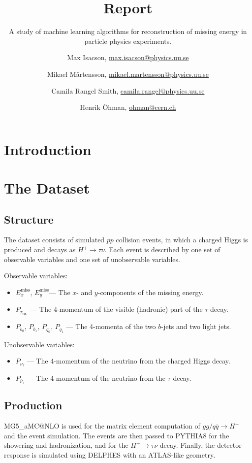 \documentclass{scrartcl}
\title{Report}
\subtitle{A study of machine learning algorithms for reconstruction of missing energy in particle physics experiments.}
\author{
  Max Isacson, \url{max.isacson@physics.uu.se}
  \and
  Mikael M\aa rtensson, \url{mikael.martensson@physics.uu.se}
  \and
  Camila Rangel Smith, \url{camila.rangel@physics.uu.se}
  \and
  Henrik Öhman, \url{ohman@cern.ch}
}
\newcommand{\exmiss}{$E_x^\text{miss}$}
\newcommand{\eymiss}{$E_y^\text{miss}$}
\begin{document}
\maketitle


\section{Introduction}

\section{The Dataset}
\subsection{Structure}
The dataset consists of simulated $pp$ collision events, in which a charged Higgs is produced and decays as $H^+\to\tau\nu$. Each event is described by one set of observable variables and one set of unobservable variables.

Observable variables:
\begin{itemize}
    \item \exmiss, \eymiss --- The $x$- and $y$-components of the missing energy.
    \item $P_{\tau_\mathrm{vis.}}$ --- The 4-momentum of the visible (hadronic) part of the $\tau$ decay.
    \item $P_{b_0}$, $P_{b_1}$, $P_{q_0}$, $P_{q_1}$ --- The 4-momenta of the two $b$-jets and two light jets.
\end{itemize}

Unobservable variables:
\begin{itemize}
    \item $P_{\nu_\tau}$ --- The 4-momentum of the neutrino from the charged Higgs decay.
    \item $P_{\bar\nu_\tau}$ --- The 4-momentum of the neutrino from the $\tau$ decay.
\end{itemize}

\subsection{Production}
MG5\_aMC@NLO \cite{Alwall:2014hca} is used for the matrix element computation of $gg / q \bar q \to H^+$ and the event simulation. The events are then passed to PYTHIA8 \cite{Sjöstrand2015159} for the showering and hadronization, and for the $H^+\to \tau\nu$ decay. Finally, the detector response is simulated using DELPHES \cite{Favereau2014} with an ATLAS-like geometry.
\end{document}
